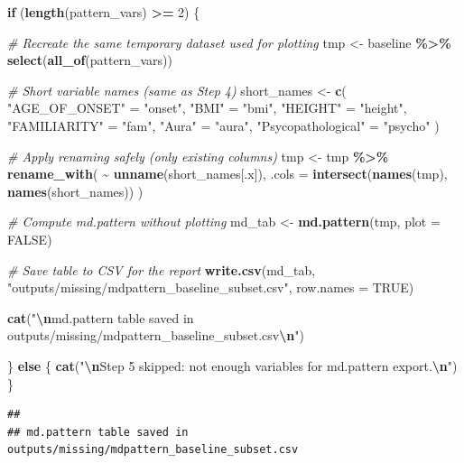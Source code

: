 \documentclass[
]{article}
\newenvironment{Shaded}{\begin{snugshade}}{\end{snugshade}}
\newcommand{\AttributeTok}[1]{\textcolor[rgb]{0.13,0.29,0.53}{#1}}
\newcommand{\CommentTok}[1]{\textcolor[rgb]{0.56,0.35,0.01}{\textit{#1}}}
\newcommand{\ConstantTok}[1]{\textcolor[rgb]{0.56,0.35,0.01}{#1}}
\newcommand{\ControlFlowTok}[1]{\textcolor[rgb]{0.13,0.29,0.53}{\textbf{#1}}}
\newcommand{\DecValTok}[1]{\textcolor[rgb]{0.00,0.00,0.81}{#1}}
\newcommand{\FunctionTok}[1]{\textcolor[rgb]{0.13,0.29,0.53}{\textbf{#1}}}
\newcommand{\NormalTok}[1]{#1}
\newcommand{\OtherTok}[1]{\textcolor[rgb]{0.56,0.35,0.01}{#1}}
\newcommand{\SpecialCharTok}[1]{\textcolor[rgb]{0.81,0.36,0.00}{\textbf{#1}}}
\newcommand{\StringTok}[1]{\textcolor[rgb]{0.31,0.60,0.02}{#1}}
\begin{document}
\begin{Shaded}
\begin{Highlighting}[]
\ControlFlowTok{if}\NormalTok{ (}\FunctionTok{length}\NormalTok{(pattern\_vars) }\SpecialCharTok{\textgreater{}=} \DecValTok{2}\NormalTok{) \{}

  \CommentTok{\# Recreate the same temporary dataset used for plotting}
\NormalTok{  tmp }\OtherTok{\textless{}{-}}\NormalTok{ baseline }\SpecialCharTok{\%\textgreater{}\%} \FunctionTok{select}\NormalTok{(}\FunctionTok{all\_of}\NormalTok{(pattern\_vars))}

  \CommentTok{\# Short variable names (same as Step 4)}
\NormalTok{  short\_names }\OtherTok{\textless{}{-}} \FunctionTok{c}\NormalTok{(}
    \StringTok{"AGE\_OF\_ONSET"} \OtherTok{=} \StringTok{"onset"}\NormalTok{,}
    \StringTok{"BMI"} \OtherTok{=} \StringTok{"bmi"}\NormalTok{,}
    \StringTok{"HEIGHT"} \OtherTok{=} \StringTok{"height"}\NormalTok{,}
    \StringTok{"FAMILIARITY"} \OtherTok{=} \StringTok{"fam"}\NormalTok{,}
    \StringTok{"Aura"} \OtherTok{=} \StringTok{"aura"}\NormalTok{,}
    \StringTok{"Psycopathological"} \OtherTok{=} \StringTok{"psycho"}
\NormalTok{  )}

  \CommentTok{\# Apply renaming safely (only existing columns)}
\NormalTok{  tmp }\OtherTok{\textless{}{-}}\NormalTok{ tmp }\SpecialCharTok{\%\textgreater{}\%}
    \FunctionTok{rename\_with}\NormalTok{(}
      \SpecialCharTok{\textasciitilde{}} \FunctionTok{unname}\NormalTok{(short\_names[.x]),}
      \AttributeTok{.cols =} \FunctionTok{intersect}\NormalTok{(}\FunctionTok{names}\NormalTok{(tmp), }\FunctionTok{names}\NormalTok{(short\_names))}
\NormalTok{    )}

  \CommentTok{\# Compute md.pattern without plotting}
\NormalTok{  md\_tab }\OtherTok{\textless{}{-}} \FunctionTok{md.pattern}\NormalTok{(tmp, }\AttributeTok{plot =} \ConstantTok{FALSE}\NormalTok{)}

  \CommentTok{\# Save table to CSV for the report}
  \FunctionTok{write.csv}\NormalTok{(md\_tab,}
            \StringTok{"outputs/missing/mdpattern\_baseline\_subset.csv"}\NormalTok{,}
            \AttributeTok{row.names =} \ConstantTok{TRUE}\NormalTok{)}

  \FunctionTok{cat}\NormalTok{(}\StringTok{"}\SpecialCharTok{\textbackslash{}n}\StringTok{md.pattern table saved in outputs/missing/mdpattern\_baseline\_subset.csv}\SpecialCharTok{\textbackslash{}n}\StringTok{"}\NormalTok{)}

\NormalTok{\} }\ControlFlowTok{else}\NormalTok{ \{}
  \FunctionTok{cat}\NormalTok{(}\StringTok{"}\SpecialCharTok{\textbackslash{}n}\StringTok{Step 5 skipped: not enough variables for md.pattern export.}\SpecialCharTok{\textbackslash{}n}\StringTok{"}\NormalTok{)}
\NormalTok{\}}
\end{Highlighting}
\end{Shaded}

\begin{verbatim}
## 
## md.pattern table saved in outputs/missing/mdpattern_baseline_subset.csv
\end{verbatim}
\end{document}
